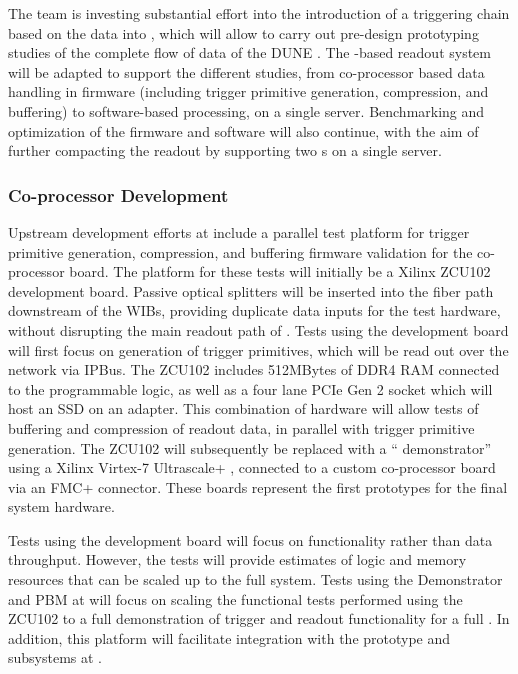 The  team is investing substantial effort into the introduction of
a triggering chain based on the  data into , which will
allow to carry out pre-design prototyping studies of the complete flow
of data of the DUNE .  
The -based readout system will be adapted to support the
different studies, from co-processor based data handling in firmware
(including trigger primitive generation, compression, and buffering) to software-based processing, on a single
server. Benchmarking and optimization of the  firmware and
software will also continue, with the aim of further compacting the
readout by supporting two s on a single server. 

\subsubsection{Co-processor Development}


Upstream  development efforts at  include a parallel test platform for trigger primitive generation, compression, and buffering firmware validation for the  co-processor board. The platform for these tests will initially be a Xilinx ZCU102 development board. Passive optical splitters will be inserted into the fiber path downstream of the WIBs, providing duplicate data inputs for the test hardware, without disrupting the main readout path of . Tests using the development board will first focus on generation of trigger primitives, which will be read out over the network via IPBus\cite{Larrea:2015wra}. The ZCU102 includes 512MBytes of DDR4 RAM connected to the  programmable logic, as well as a four lane PCIe Gen 2 socket which will host an  SSD on an adapter. This combination of hardware will allow tests of buffering and compression of readout data, in parallel with trigger primitive generation. The ZCU102 will subsequently be replaced with a `` demonstrator'' using a Xilinx Virtex-7 Ultrascale+ , connected to a custom  co-processor board via an FMC+ connector. These boards represent the first prototypes for the final system hardware.

Tests using the development board will focus on functionality rather than data throughput. However, the tests will provide estimates of  logic and memory resources that can be scaled up to the full system. Tests using the  Demonstrator and PBM at  will focus on scaling the functional tests performed using the ZCU102 to a full demonstration of trigger and readout functionality for a full . In addition, this platform will facilitate integration with the prototype  and  subsystems at . 

